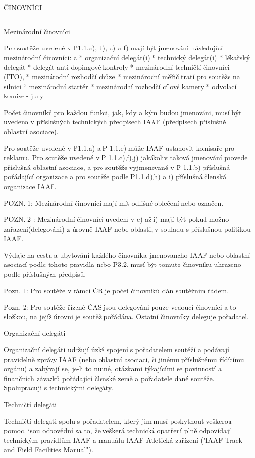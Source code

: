 \sec ČINOVNÍCI

\rule{109}
\secc Mezinárodní činovníci

Pro soutěže uvedené v P1.1.a), b), c) a f) mají být jmenováni následující mezinárodní činovníci:
\begitems \style a
* organizační delegát(i)
* technický delegát(i)
* lékařský delegát
* delegát anti-dopingové kontroly
* mezinárodní techničtí činovníci (ITO),
* mezinárodní rozhodčí chůze
* mezinárodní měřič tratí pro soutěže na silnici
* mezinárodní startér
* mezinárodní rozhodčí cílové kamery
* odvolací komise - jury
\enditems

Počet činovníků pro každou funkci, jak, kdy a kým budou jmenováni, musí být uvedeno v příslušných technických předpisech IAAF (předpisech příslušné oblastní asociace).

Pro soutěže uvedené v P1.1.a) a P 1.1.e) může IAAF ustanovit komisaře pro reklamu.
Pro soutěže uvedené v P 1.1.c),f),j) jakákoliv taková jmenování provede příslušná oblastní asociace, a pro soutěže vyjmenované v P 1.1.b) příslušná pořádající organizace a pro soutěže podle P1.1.d),h) a i) příslušná členská organizace IAAF.

POZN. 1: Mezinárodní činovníci mají mít odlišné oblečení nebo označen.

POZN. 2 : Mezinárodní činovníci uvedení v e) až i) mají být pokud možno zařazeni(delegováni) z úrovně IAAF nebo oblasti, v souladu s příslušnou politikou IAAF.

Výdaje na cestu a ubytování každého činovníka jmenovaného IAAF nebo oblastní asociací podle tohoto pravidla nebo P3.2, musí být tomuto činovníku uhrazeno podle příslušných předpisů.

Pozn. 1: Pro soutěže v rámci ČR je počet činovníků dán soutěžním řádem.

Pozn. 2: Pro soutěže řízené ČAS jsou delegováni pouze vedoucí činovníci a to složkou, na jejíž úrovni je soutěž pořádána.
Ostatní činovníky deleguje pořadatel.

\secc Organizační delegáti

Organizační delegáti udržují úzké spojení s pořadatelem soutěží a podávají pravidelně zprávy IAAF (nebo oblastní asociaci, či jinému příslušnému řídícímu orgánu) a zabývají se, je-li to nutné, otázkami týkajícími se povinností a finančních závazků pořádající členské země a pořadatele dané soutěže.
Spolupracují s technickými delegáty.

\secc Techničtí delegáti

Techničtí delegáti spolu s pořadatelem, který jim musí poskytnout veškerou pomoc, jsou odpovědní za to, že veškerá technická opatření plně odpovídají technickým pravidlům IAAF a manuálu IAAF Atletická zařízení ("IAAF Track and Field Facilities Manual").

